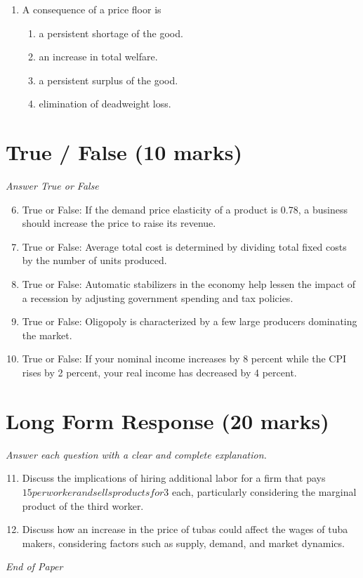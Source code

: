 \documentclass[12pt]{article}
\begin{document}
\begin{enumerate}[label=\arabic*.]
\begin{enumerate}[label=(\alph*)]
    \item Both the price level and real GDP rise.
    \item The price level rises but the change in real GDP is uncertain.
    \item Real GDP rises but the change in the price level is uncertain.
\end{enumerate}
\item A consequence of a price floor is
\begin{enumerate}[label=(\alph*)]
    \item a persistent shortage of the good.
    \item an increase in total welfare.
    \item a persistent surplus of the good.
    \item elimination of deadweight loss.
\end{enumerate}
\end{enumerate}

\section*{True / False (10 marks)}
\textit{Answer True or False}
\begin{enumerate}[label=\arabic*.]
\setcounter{enumi}{5}
\item True or False: If the demand price elasticity of a product is 0.78, a business should increase the price to raise its revenue.
\item True or False: Average total cost is determined by dividing total fixed costs by the number of units produced.
\item True or False: Automatic stabilizers in the economy help lessen the impact of a recession by adjusting government spending and tax policies.
\item True or False: Oligopoly is characterized by a few large producers dominating the market.
\item True or False: If your nominal income increases by 8 percent while the CPI rises by 2 percent, your real income has decreased by 4 percent.
\end{enumerate}

\section*{Long Form Response (20 marks)}
\textit{Answer each question with a clear and complete explanation.}
\begin{enumerate}[label=\arabic*.]
\setcounter{enumi}{10}
\item Discuss the implications of hiring additional labor for a firm that pays $15 per worker and sells products for $3 each, particularly considering the marginal product of the third worker.
\item Discuss how an increase in the price of tubas could affect the wages of tuba makers, considering factors such as supply, demand, and market dynamics.
\end{enumerate}

\vfill
\noindent\textit{End of Paper}
\end{document}
